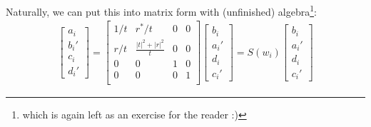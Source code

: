 \documentclass[10pt, letter, oneside,graphicx]{article}
\begin{document}
Naturally, we can put this into matrix form with (unfinished) algebra\footnote{which is again left as an exercise for the reader :)}:
\begin{align*}
\left[ \begin{array}{c}
a_i \\ b_i' \\ c_i \\ d_i'
\end{array} \right]
=
\left[ \begin{array}{cccc}
1/t & r^*/t & 0 & 0 \\
r/t & \frac{|t|^2 + |r|^2}{t} & 0 & 0 \\
0 & 0 & 1 & 0 \\
0 & 0 & 0 & 1 \\
\end{array} \right]
\left[ \begin{array}{c}
b_i \\ a_i' \\ d_i \\ c_i'
\end{array} \right]
=
S(w_i)
\left[ \begin{array}{c}
b_i \\ a_i' \\ d_i \\ c_i'
\end{array} \right]
\end{align*}
\end{document}
